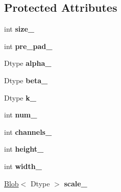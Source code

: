 \subsection*{Protected Attributes}
\begin{DoxyCompactItemize}
\item 
\mbox{\label{classcaffe_1_1_l_r_n_layer_a4d74c3370e28abe013bf0fcc815fcc17}} 
int {\bfseries size\+\_\+}
\item 
\mbox{\label{classcaffe_1_1_l_r_n_layer_a5d4a63f1279542a4fbe2780ba061f800}} 
int {\bfseries pre\+\_\+pad\+\_\+}
\item 
\mbox{\label{classcaffe_1_1_l_r_n_layer_ae5a9eaf89e4082afe166f0fa7ee3b4ed}} 
Dtype {\bfseries alpha\+\_\+}
\item 
\mbox{\label{classcaffe_1_1_l_r_n_layer_aa0765abb189bb6be067494ea5cc925f2}} 
Dtype {\bfseries beta\+\_\+}
\item 
\mbox{\label{classcaffe_1_1_l_r_n_layer_a2fd6dd95ba02ae082bf5668305f19844}} 
Dtype {\bfseries k\+\_\+}
\item 
\mbox{\label{classcaffe_1_1_l_r_n_layer_ac68d88464a09f9deaf929908ffbaf345}} 
int {\bfseries num\+\_\+}
\item 
\mbox{\label{classcaffe_1_1_l_r_n_layer_acd1bc62c5c9074c1df80f12d716f9a7a}} 
int {\bfseries channels\+\_\+}
\item 
\mbox{\label{classcaffe_1_1_l_r_n_layer_a9fa09286b061a99713b4268259fdaad7}} 
int {\bfseries height\+\_\+}
\item 
\mbox{\label{classcaffe_1_1_l_r_n_layer_a5b12d5c779f16e9b1caf4c3a6d581e09}} 
int {\bfseries width\+\_\+}
\item 
\mbox{\label{classcaffe_1_1_l_r_n_layer_aff512c7b3346236100fd9f1c8de1db95}} 
\mbox{\hyperlink{classcaffe_1_1_blob}{Blob}}$<$ Dtype $>$ {\bfseries scale\+\_\+}
\item 

\end{DoxyCompactItemize}
